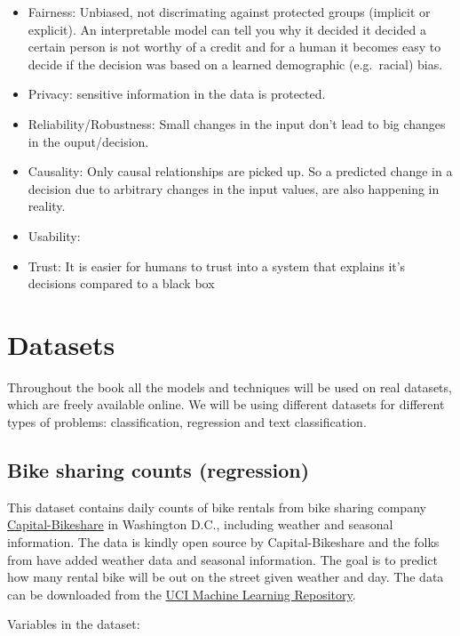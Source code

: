 \documentclass[12pt,]{krantz}
\providecommand{\tightlist}{%
  \setlength{\itemsep}{0pt}\setlength{\parskip}{0pt}}
\theoremstyle{definition}
\theoremstyle{definition}
\theoremstyle{definition}
\theoremstyle{remark}
\begin{document}
\begin{itemize}
\tightlist
\item
  Fairness: Unbiased, not discrimating against protected groups
  (implicit or explicit). An interpretable model can tell you why it
  decided it decided a certain person is not worthy of a credit and for
  a human it becomes easy to decide if the decision was based on a
  learned demographic (e.g.~racial) bias.
\item
  Privacy: sensitive information in the data is protected.
\item
  Reliability/Robustness: Small changes in the input don't lead to big
  changes in the ouput/decision.
\item
  Causality: Only causal relationships are picked up. So a predicted
  change in a decision due to arbitrary changes in the input values, are
  also happening in reality.
\item
  Usability:
\item
  Trust: It is easier for humans to trust into a system that explains
  it's decisions compared to a black box
\end{itemize}

\chapter{Datasets}\label{data}

Throughout the book all the models and techniques will be used on real
datasets, which are freely available online. We will be using different
datasets for different types of problems: classification, regression and
text classification.

\section{Bike sharing counts (regression)}\label{bike.data}

This dataset contains daily counts of bike rentals from bike sharing
company \href{https://www.capitalbikeshare.com/}{Capital-Bikeshare} in
Washington D.C., including weather and seasonal information. The data is
kindly open source by Capital-Bikeshare and the folks from
\citep{bike2013} have added weather data and seasonal information. The
goal is to predict how many rental bike will be out on the street given
weather and day. The data can be downloaded from the
\href{http://archive.ics.uci.edu/ml/datasets/Bike+Sharing+Dataset}{UCI
Machine Learning Repository}.

Variables in the dataset:
\end{document}
